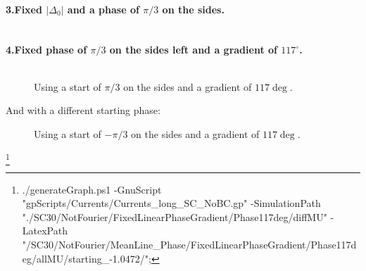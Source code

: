 \documentclass[../main.tex]{subfiles}
\begin{document}
\paragraph{3.Fixed $|\Delta_0|$ and a phase of $\pi/3$ on the sides.}$~$\\
\begin{figure}[H]
    \centering
    
    \caption{}
\end{figure}
\begin{figure}[H]
    \centering
    
    \caption{}
\end{figure}
\paragraph{4.Fixed phase of $\pi/3$ on the sides left and a gradient of $117^{\circ}$.}$~$\\
\begin{figure}[H]
    \centering
    
    \caption{Using a start of $\pi/3$ on the sides and a gradient of $117\si{\deg}$.}
\end{figure}
And  with a different starting phase:
\begin{figure}[H]
    \centering
    
    
    \caption{Using a start of $-\pi/3$ on the sides and a gradient of $117\si{\deg}$.}
\end{figure}
\footnote{./generateGraph.ps1 -GnuScript "gpScripts/Currents/Currents\_long\_SC\_NoBC.gp" -SimulationPath "./SC30/NotFourier/FixedLinearPhaseGradient/Phase117deg/diffMU" -LatexPath "/SC30/NotFourier/MeanLine\_Phase/FixedLinearPhaseGradient/Phase117deg/allMU/starting\_-1.0472/";}
\end{document}
